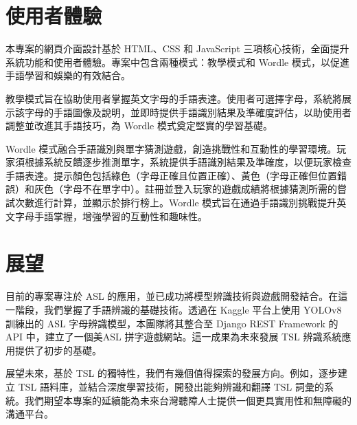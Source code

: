 \documentclass[conference]{IEEEtran}
\begin{document}
\section{使用者體驗}

本專案的網頁介面設計基於 HTML、CSS 和 JavaScript 三項核心技術，全面提升系統功能和使用者體驗。專案中包含兩種模式：教學模式和 Wordle 模式，以促進手語學習和娛樂的有效結合。

教學模式旨在協助使用者掌握英文字母的手語表達。使用者可選擇字母，系統將展示該字母的手語圖像及說明，並即時提供手語識別結果及準確度評估，以助使用者調整並改進其手語技巧，為 Wordle 模式奠定堅實的學習基礎。

Wordle 模式融合手語識別與單字猜測遊戲，創造挑戰性和互動性的學習環境。玩家須根據系統反饋逐步推測單字，系統提供手語識別結果及準確度，以便玩家檢查手語表達。提示顏色包括綠色（字母正確且位置正確）、黃色（字母正確但位置錯誤）和灰色（字母不在單字中）。註冊並登入玩家的遊戲成績將根據猜測所需的嘗試次數進行計算，並顯示於排行榜上。Wordle 模式旨在通過手語識別挑戰提升英文字母手語掌握，增強學習的互動性和趣味性。

\section{展望}

目前的專案專注於 ASL 的應用，並已成功將模型辨識技術與遊戲開發結合。在這一階段，我們掌握了手語辨識的基礎技術。透過在 Kaggle 平台上使用 YOLOv8 訓練出的 ASL 字母辨識模型，本團隊將其整合至 Django REST Framework 的 API 中，建立了一個美ASL 拼字遊戲網站。這一成果為未來發展 TSL 辨識系統應用提供了初步的基礎。

展望未來，基於 TSL 的獨特性，我們有幾個值得探索的發展方向。例如，逐步建立 TSL 語料庫，並結合深度學習技術，開發出能夠辨識和翻譯 TSL 詞彙的系統。我們期望本專案的延續能為未來台灣聽障人士提供一個更具實用性和無障礙的溝通平台。

\printbibliography
\end{document}
